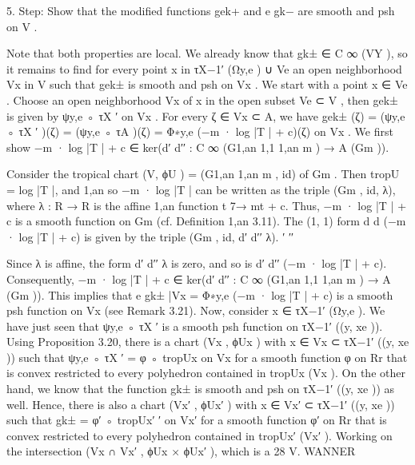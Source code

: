 \documentclass[
  10pt,
]{article}
\newenvironment{Shaded}{}{}
\newcommand{\NormalTok}[1]{#1}
\begin{document}
\begin{Shaded}
\begin{Highlighting}[]
\NormalTok{  5. Step: Show that the modified functions gek+ and e}
\NormalTok{                                                     gk− are smooth and psh on V .}


\NormalTok{  Note that both properties are local. We already know that gk± ∈ C ∞ (VY ), so it}
\NormalTok{remains to find for every point x in τX−1′ (Ωy,e ) ∪ Ve an open neighborhood Vx in V such}
\NormalTok{that gek± is smooth and psh on Vx .}
\NormalTok{  We start with a point x ∈ Ve . Choose an open neighborhood Vx of x in the open}
\NormalTok{subset Ve ⊂ V , then gek± is given by ψy,e ◦ τX ′ on Vx . For every ζ ∈ Vx ⊂ A, we have}
\NormalTok{            gek± (ζ) = (ψy,e ◦ τX ′ )(ζ) = (ψy,e ◦ τA )(ζ) = Φ∗y,e (−m · log |T | + c)(ζ)}
\NormalTok{on Vx . We first show}
\NormalTok{                   −m · log |T | + c ∈ ker(d′ d′′ : C ∞ (G1,an   1,1 1,an}
\NormalTok{                                                          m ) → A (Gm )).}

\NormalTok{Consider the tropical chart (V, ϕU ) = (G1,an                  1,an}
\NormalTok{                                               m , id) of Gm . Then tropU = log |T |, and}
\NormalTok{                                                    1,an}
\NormalTok{so −m · log |T | can be written as the triple (Gm , id, λ), where λ : R → R is the affine}
\NormalTok{                                                                               1,an}
\NormalTok{function t 7→ mt + c. Thus, −m · log |T | + c is a smooth function on Gm            (cf. Definition}
\NormalTok{                                                                                    1,an}
\NormalTok{3.11). The (1, 1) form d d (−m · log |T | + c) is given by the triple (Gm , id, d′ d′′ λ).}
\NormalTok{                              ′ ′′}

\NormalTok{Since λ is affine, the form d′ d′′ λ is zero, and so is d′ d′′ (−m · log |T | + c). Consequently,}
\NormalTok{−m · log |T | + c ∈ ker(d′ d′′ : C ∞ (G1,an         1,1    1,an}
\NormalTok{                                         m ) → A (Gm )). This implies that e              gk± |Vx =}
\NormalTok{Φ∗y,e (−m · log |T | + c) is a smooth psh function on Vx (see Remark 3.21).}
\NormalTok{   Now, consider x ∈ τX−1′ (Ωy,e ). We have just seen that ψy,e ◦ τX ′ is a smooth psh}
\NormalTok{function on τX−1′ ((y, xe )). Using Proposition 3.20, there is a chart (Vx , ϕUx ) with x ∈}
\NormalTok{Vx ⊂ τX−1′ ((y, xe )) such that ψy,e ◦ τX ′ = φ ◦ tropUx on Vx for a smooth function φ on}
\NormalTok{Rr that is convex restricted to every polyhedron contained in tropUx (Vx ). On the other}
\NormalTok{hand, we know that the function gk± is smooth and psh on τX−1′ ((y, xe )) as well. Hence,}
\NormalTok{there is also a chart (Vx′ , ϕUx′ ) with x ∈ Vx′ ⊂ τX−1′ ((y, xe )) such that gk± = φ′ ◦ tropUx′}
\NormalTok{                                            ′}
\NormalTok{on Vx′ for a smooth function φ′ on Rr that is convex restricted to every polyhedron}
\NormalTok{contained in tropUx′ (Vx′ ). Working on the intersection (Vx ∩ Vx′ , ϕUx × ϕUx′ ), which is a}
\NormalTok{28                                         V. WANNER}



\end{Highlighting}
\end{Shaded}
\end{document}
